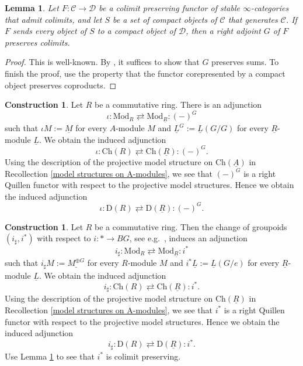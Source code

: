 \documentclass[10pt]{amsart}
\newtheorem{lem}[thm]{Lemma}
\theoremstyle{definition}
\newtheorem{const}[thm]{Construction}
\numberwithin{equation}{section}
\newcommand{\cC}{\mathcal{C}}
\newcommand{\cD}{\mathcal{D}}
\newcommand{\rD}{\mathrm{D}}
\newcommand{\ul}{\underline}
\newcommand{\Mod}{\mathrm{Mod}}
\newcommand{\Ch}{\mathrm{Ch}}
\begin{document}
\begin{lem}
\label{right adjoint colimits}
Let $F\colon \cC\to \cD$ be a colimit preserving functor of stable $\infty$-categories that admit colimits,
and let $S$ be a set of compact objects of $\cC$ that generates $\cC$.
If $F$ sends every object of $S$ to a compact object of $\cD$,
then a right adjoint $G$ of $F$ preserves colimits.
\end{lem}
\begin{proof}
This is well-known.
By \cite[Proposition 1.4.4.1(2)]{HA},
it suffices to show that $G$ preserves sums.
To finish the proof,
use the property that the functor corepresented by a compact object preserves coproducts.
\end{proof}

\begin{const}
\label{construction of abelian iota}
Let $R$ be a commutative ring.
There is an adjunction
\[
\iota
:
\Mod_R
\rightleftarrows
\Mod_{\ul{R}}
:
(-)^{G}
\]
such that $\iota M:=\ul{M}$ for every $A$-module $M$ and $\ul{L}^{G}:=\ul{L}(G/G)$ 
for every $\ul{R}$-module $\ul{L}$.
We obtain the induced adjunction
\[
\iota
:
\Ch(R)
\rightleftarrows
\Ch(\ul{R})
:
(-)^{G}.
\]
Using the description of the projective model structure on $\Ch(\ul{A})$ in Recollection \ref{model structures on A-modules},
we see that $(-)^{G}$ is a right Quillen functor with respect to the projective model structures.
Hence we obtain the induced adjunction
\[
\iota
:
\rD(R)
\rightleftarrows
\rD(\ul{R})
:
(-)^{G}.
\]
\end{const}

\begin{const}\label{construction of abelian isharp}
Let $R$ be a commutative ring.
Then the change of groupoids $(i_{\sharp},i^*)$ with respect to $i:* \to BG$, see e.g.\ \cite[section A.1]{HP23}, induces  an adjunction
\[
i_\sharp
:
\Mod_R
\rightleftarrows
\Mod_{\ul{R}}
:
i^*
\]
such that $i_\sharp M:=\ul{M^{\oplus G}}$ for every $R$-module $M$ and $i^*\ul{L}:=\ul{L}(G/e)$ for every $\ul{R}$-module $\ul{L}$.
We obtain the induced adjunction
\[
i_\sharp
:
\Ch(R)
\rightleftarrows
\Ch(\ul{R})
:
i^*.
\]
Using the description of the projective model structure on $\Ch(\ul{R})$ in Recollection \ref{model structures on A-modules},
we see that $i^*$ is a right Quillen functor with respect to the projective model structures.
Hence we obtain the induced adjunction
\[
i_\sharp
:
\rD(R)
\rightleftarrows
\rD(\ul{R})
:
i^*.
\]
Use Lemma \ref{right adjoint colimits} to see that $i^*$ is colimit preserving.
\end{const}
\end{document}
